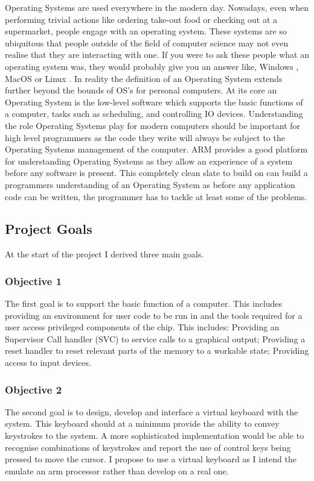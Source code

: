 Operating Systems are used everywhere in the modern day. Nowadays, even when performing trivial actions like ordering take-out food or checking out at a supermarket, people engage with an operating system. These systems are so ubiquitous that people outside of the field of computer science may not even realise that they are interacting with one. If you were  to ask these people what an operating system was, they would probably give you an answer like, Windows \cite{windows}, MacOS \cite{apple} or Linux \cite{linux}. In reality the definition of an Operating System extends further beyond the bounds of OS's for personal computers. At its core an Operating System is the low-level software which supports the basic functions of a computer, tasks such as scheduling, and controlling IO devices. Understanding the role Operating Systems play for modern computers should be important for high level programmers as the code they write will always be subject to the Operating Systems management of the computer. ARM provides a good platform for understanding Operating Systems as they allow an experience of a system before any software is present. This completely clean slate to build on can build a programmers understanding of an Operating System as before any application code can be written, the programmer has to tackle at least some of the problems. 

\subsection{Project Goals}
At the start of the project I derived three main goals.
\subsubsection{Objective 1}
\label{obj1}
The first goal is to support the basic function of a computer. This includes providing an environment for user code to be run in and the tools required for a user access privileged components of the chip. This includes: Providing an Supervisor Call handler (SVC) to service calls to a graphical output; Providing a reset handler to reset relevant parts of the memory to a workable state; Providing access to input devices. 
\subsubsection{Objective 2}
\label{obj2}
The second goal is to design, develop and interface a virtual keyboard with the system. This keyboard should at a minimum provide the ability to convey keystrokes to the system. A more sophisticated implementation would be able to recognise combinations of keystrokes and report the use of control keys being pressed to move the cursor. I propose to use a virtual keyboard as I intend the emulate an arm processor rather than develop on a real one. 
